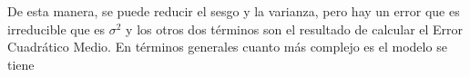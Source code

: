 \noindent De esta manera, se puede reducir el sesgo y la varianza, pero hay un error que es irreducible que es $\sigma^2$ y los otros dos términos son el resultado de calcular el Error Cuadrático Medio. En términos generales cuanto más complejo es el modelo se tiene 













































































































\newpage
